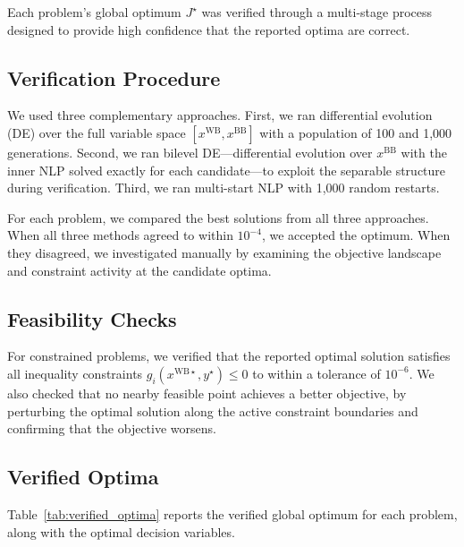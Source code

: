 \documentclass[12pt,a4paper]{article}%
\theoremstyle{plain}%
\theoremstyle{remark}%
\theoremstyle{definition}%
\def\WB{\mathrm{WB}}
\def\BB{\mathrm{BB}}
\begin{document}
\begin{appendices}
Each problem's global optimum $J^\star$ was verified through a multi-stage process designed to provide high confidence that the reported optima are correct.

\subsection{Verification Procedure}\label{subsec:verification_procedure}

We used three complementary approaches. First, we ran differential evolution (DE) over the full variable space $[x^{\WB}, x^{\BB}]$ with a population of 100 and 1{,}000 generations. Second, we ran bilevel DE---differential evolution over $x^{\BB}$ with the inner NLP solved exactly for each candidate---to exploit the separable structure during verification. Third, we ran multi-start NLP with 1{,}000 random restarts.

For each problem, we compared the best solutions from all three approaches. When all three methods agreed to within $10^{-4}$, we accepted the optimum. When they disagreed, we investigated manually by examining the objective landscape and constraint activity at the candidate optima.

\subsection{Feasibility Checks}\label{subsec:feasibility_checks}

For constrained problems, we verified that the reported optimal solution satisfies all inequality constraints $g_i(x^{\WB\star}, y^\star) \leq 0$ to within a tolerance of $10^{-6}$. We also checked that no nearby feasible point achieves a better objective, by perturbing the optimal solution along the active constraint boundaries and confirming that the objective worsens.

\subsection{Verified Optima}\label{subsec:verified_optima}

Table~\ref{tab:verified_optima} reports the verified global optimum for each problem, along with the optimal decision variables.


\end{appendices}
\end{document}

